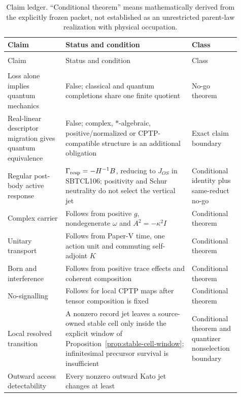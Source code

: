 \documentclass[11pt]{article}
\begin{document}
\begingroup
\small
\sloppy
\begin{longtable}{@{}>{\raggedright\arraybackslash}p{0.23\linewidth}>{\raggedright\arraybackslash}p{0.50\linewidth}>{\raggedright\arraybackslash}p{0.18\linewidth}@{}}
\caption{Claim ledger.  ``Conditional theorem'' means mathematically derived
from the explicitly frozen packet, not established as an unrestricted
parent-law realization with physical occupation.}
\label{tab:ledger}\\
\toprule
Claim & Status and condition & Class \\
\midrule
\endfirsthead
\multicolumn{3}{c}{\small\itshape Claim ledger (continued)}\\
\toprule
Claim & Status and condition & Class \\
\midrule
\endhead
\midrule
\multicolumn{3}{r}{\small\itshape Continued on next page}\\
\endfoot
\bottomrule
\endlastfoot
Loss alone implies quantum mechanics & False; classical and quantum
completions share one finite quotient & No-go theorem \\
Real-linear descriptor migration gives quantum equivalence & False; complex,
\(*\)-algebraic, positive/normalized or CPTP-compatible structure is an
additional obligation & Exact claim boundary \\
Regular post-body active response & \(\Gamma_{\rm resp}=-H^{-1}B\), reducing
to \(J_{OS}\) in SBTCL106; positivity and Schur neutrality do not select the
vertical jet & Conditional identity plus same-reduct no-go \\
Complex carrier & Follows from positive $g$, nondegenerate $\omega$ and
$A^2=-\kappa^2I$ & Conditional theorem \\
Unitary transport & Follows from Paper-V time, one action unit and commuting
self-adjoint $K$ & Conditional theorem \\
Born and interference & Follows from positive trace effects and coherent
composition & Conditional theorem \\
No-signalling & Follows for local CPTP maps after tensor composition is fixed
& Conditional theorem \\
Local resolved transition & A nonzero record jet leaves a source-owned stable
cell only inside the explicit window of
Proposition~\ref{prop:stable-cell-window}; infinitesimal precursor survival is
insufficient & Conditional theorem and quantizer nonselection boundary \\
Outward access detectability & Every nonzero outward Kato jet changes at least

\end{longtable}
\end{document}
